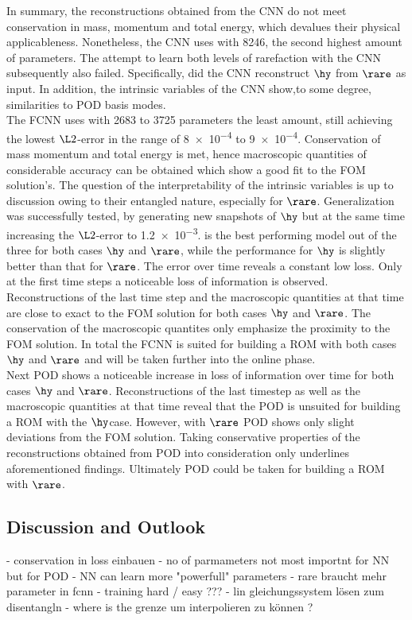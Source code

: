 In summary, the reconstructions obtained from the CNN do not meet conservation in mass, momentum and total energy, which devalues their physical applicableness. Nonetheless, the CNN uses with 8246, the second highest amount of parameters. The attempt to learn both levels of rarefaction with the CNN subsequently also failed. Specifically, did the CNN reconstruct \(\hy\) from \(\rare\) as input. In addition, the intrinsic variables of the CNN show,to some degree, similarities to POD basis modes. \\
The FCNN uses with 2683 to 3725 parameters the least amount, still achieving the lowest \(\L2\)-error in the range of \num{8e-4} to \num{9e-4}. Conservation of mass momentum and total energy is met, hence macroscopic quantities of considerable accuracy can be obtained which show a good fit to the FOM solution's. The question of the interpretability of the intrinsic variables is up to discussion owing to their entangled nature, especially for \(\rare\). Generalization was successfully tested, by generating new snapshots of \(\hy\) but at the same time increasing the \(\L2\)-error to \num{1.2e-3}.   
is the best performing model out of the three for both cases \(\hy\) and \(\rare\), while the performance for \(\hy\) is slightly better than that for \(\rare\). The error over time reveals a constant low loss. Only at the first time steps a noticeable loss of information is observed. Reconstructions of the last time step and the macroscopic quantities at that time are close to exact to the FOM solution for both cases \(\hy\) and \(\rare\). The conservation of the macroscopic quantites only emphasize the proximity to the FOM solution. In total the FCNN is suited for building a ROM with both cases \(\hy\) and \(\rare\) and will be taken further into the online phase.\\
Next POD shows a noticeable increase in loss of information over time for both cases \(\hy\) and \(\rare\). Reconstructions of the last timestep as well as the macroscopic quantities at that time reveal that the POD is unsuited for building a ROM with the \(\hy\)case. However, with \(\rare\) POD shows only slight deviations from the FOM solution. Taking conservative properties of the reconstructions obtained from POD into consideration only underlines aforementioned findings. Ultimately POD could be taken for building a ROM with \(\rare\). 
\subsection{Discussion and Outlook}
- conservation in loss einbauen
- no of parmameters not most importnt for NN but for POD
- NN can learn more "powerfull" parameters
- rare braucht mehr parameter in fcnn
- training hard / easy ???
- lin gleichungssystem lösen zum disentangln
- where is the grenze um interpolieren zu können ?


